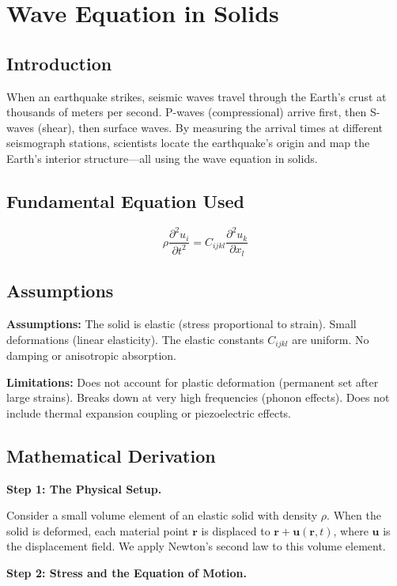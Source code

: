 \chapter{Wave Equation in Solids}

\section*{Introduction}

When an earthquake strikes, seismic waves travel through the Earth's crust at thousands of meters per second. P-waves (compressional) arrive first, then S-waves (shear), then surface waves. By measuring the arrival times at different seismograph stations, scientists locate the earthquake's origin and map the Earth's interior structure---all using the wave equation in solids.

\section*{Fundamental Equation Used}

\[
\rho \frac{\partial^2 u_i}{\partial t^2} = C_{ijkl} \frac{\partial^2 u_k}{\partial x_l}
\]
\section*{Assumptions}

\textbf{Assumptions:} The solid is elastic (stress proportional to strain). Small deformations (linear elasticity). The elastic constants $C_{ijkl}$ are uniform. No damping or anisotropic absorption.


\textbf{Limitations:} Does not account for plastic deformation (permanent set after large strains). Breaks down at very high frequencies (phonon effects). Does not include thermal expansion coupling or piezoelectric effects.


\section*{Mathematical Derivation}

\textbf{Step 1: The Physical Setup.}

Consider a small volume element of an elastic solid with density $\rho$. When the solid is deformed, each material point $\mathbf{r}$ is displaced to $\mathbf{r} + \mathbf{u}(\mathbf{r}, t)$, where $\mathbf{u}$ is the displacement field. We apply Newton's second law to this volume element.

\textbf{Step 2: Stress and the Equation of Motion.}

